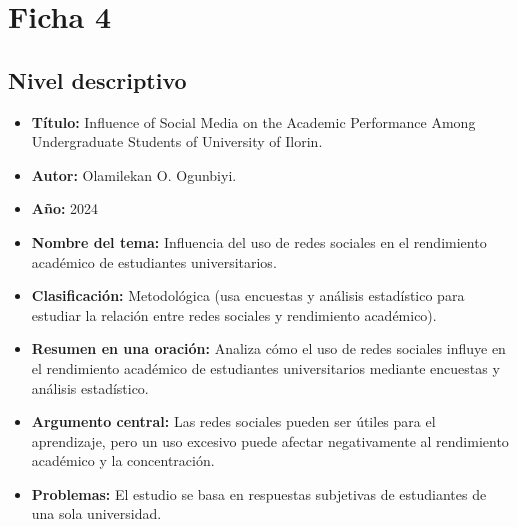 \documentclass[12pt]{article}
\begin{document}
\section*{Ficha 4}

\subsection*{Nivel descriptivo}
\begin{itemize}
  \item \textbf{Título:} Influence of Social Media on the Academic Performance Among Undergraduate Students of University of Ilorin.
  \item \textbf{Autor:} Olamilekan O. Ogunbiyi.
  \item \textbf{Año:} 2024
  \item \textbf{Nombre del tema:} Influencia del uso de redes sociales en el rendimiento académico de estudiantes universitarios.
  \item \textbf{Clasificación:} Metodológica (usa encuestas y análisis estadístico para estudiar la relación entre redes sociales y rendimiento académico).
  \item \textbf{Resumen en una oración:} Analiza cómo el uso de redes sociales influye en el rendimiento académico de estudiantes universitarios mediante encuestas y análisis estadístico.
  \item \textbf{Argumento central:} Las redes sociales pueden ser útiles para el aprendizaje, pero un uso excesivo puede afectar negativamente al rendimiento académico y la concentración.
  \item \textbf{Problemas:} El estudio se basa en respuestas subjetivas de estudiantes de una sola universidad.
\end{itemize}
\end{document}
